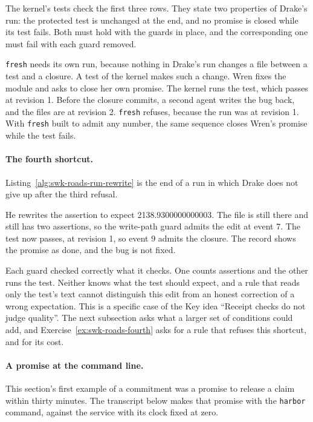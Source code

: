 The kernel's tests check the first three rows. They state two properties of
Drake's run: the protected test is unchanged at the end, and no promise is
closed while its test fails. Both must hold with the guards in place, and
the corresponding one must fail with each guard removed.

\texttt{fresh} needs its own run, because nothing in Drake's run changes a
file between a test and a closure. A test of the kernel makes such a change.
Wren fixes the module and asks to close her own promise. The kernel runs the
test, which passes at revision 1. Before the closure commits, a second agent
writes the bug back, and the files are at revision 2. \texttt{fresh}
refuses, because the run was at revision 1. With \texttt{fresh} built to
admit any number, the same sequence closes Wren's promise while the test
fails.

\paragraph{The fourth shortcut.}
Listing~\ref{alg:swk-roads-run-rewrite} is the end of a run in which Drake
does not give up after the third refusal.


He rewrites the assertion to expect 2138.9300000000003. The file is still
there and still has two assertions, so the write-path guard admits the edit
at event 7. The test now passes, at revision 1, so event 9 admits the
closure. The record shows the promise as done, and the bug is not fixed.

Each guard checked correctly what it checks. One counts assertions and the
other runs the test. Neither knows what the test should expect, and a rule
that reads only the test's text cannot distinguish this edit from an honest
correction of a wrong expectation. This is a specific case of the Key idea
``Receipt checks do not judge quality''. The next subsection asks what a
larger set of conditions could add, and
Exercise~\ref{ex:swk-roads-fourth} asks for a rule that refuses this
shortcut, and for its cost.

\paragraph{A promise at the command line.}
This section's first example of a commitment was a promise to release a
claim within thirty minutes. The transcript below makes that promise with
the \texttt{harbor} command, against the service with its clock fixed at
zero.


